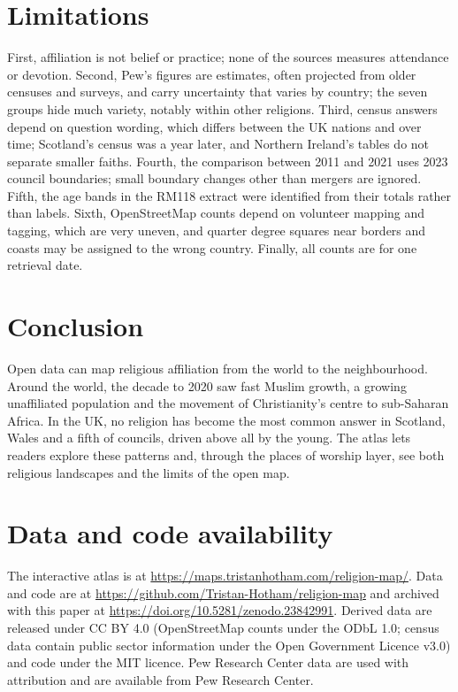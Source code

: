 \documentclass[11pt,a4paper]{article}
\begin{document}
\section{Limitations}
First, affiliation is not belief or practice; none of the sources measures attendance or devotion. Second, Pew's figures are estimates, often projected from older censuses and surveys, and carry uncertainty that varies by country; the seven groups hide much variety, notably within other religions. Third, census answers depend on question wording, which differs between the UK nations and over time; Scotland's census was a year later, and Northern Ireland's tables do not separate smaller faiths. Fourth, the comparison between 2011 and 2021 uses 2023 council boundaries; small boundary changes other than mergers are ignored. Fifth, the age bands in the RM118 extract were identified from their totals rather than labels. Sixth, OpenStreetMap counts depend on volunteer mapping and tagging, which are very uneven, and quarter degree squares near borders and coasts may be assigned to the wrong country. Finally, all counts are for one retrieval date.

\section{Conclusion}
Open data can map religious affiliation from the world to the neighbourhood. Around the world, the decade to 2020 saw fast Muslim growth, a growing unaffiliated population and the movement of Christianity's centre to sub-Saharan Africa. In the UK, no religion has become the most common answer in Scotland, Wales and a fifth of councils, driven above all by the young. The atlas lets readers explore these patterns and, through the places of worship layer, see both religious landscapes and the limits of the open map.

\section*{Data and code availability}
The interactive atlas is at \url{https://maps.tristanhotham.com/religion-map/}. Data and code are at \url{https://github.com/Tristan-Hotham/religion-map} and archived with this paper at \url{https://doi.org/10.5281/zenodo.23842991}. Derived data are released under CC BY 4.0 (OpenStreetMap counts under the ODbL 1.0; census data contain public sector information under the Open Government Licence v3.0) and code under the MIT licence. Pew Research Center data are used with attribution and are available from Pew Research Center.
\end{document}
